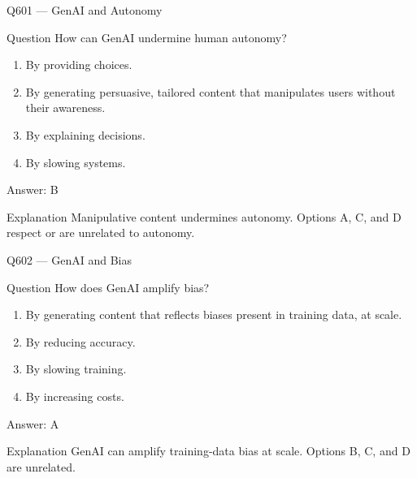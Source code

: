 \documentclass[aspectratio=169,8pt]{beamer}
\begin{document}
	\begin{frame}{Q601 --- GenAI and Autonomy}
		\begin{block}{Question}
			How can GenAI undermine human autonomy?
			\begin{enumerate}
				\item By providing choices.
				\item By generating persuasive, tailored content that manipulates users without their awareness.
				\item By explaining decisions.
				\item By slowing systems.
			\end{enumerate}
		\end{block}
		\begin{exampleblock}{Answer: B}\end{exampleblock}
		\begin{block}{Explanation}
			Manipulative content undermines autonomy. Options A, C, and D respect or are unrelated to autonomy.
		\end{block}
	\end{frame}
	
	\begin{frame}{Q602 --- GenAI and Bias}
		\begin{block}{Question}
			How does GenAI amplify bias?
			\begin{enumerate}
				\item By generating content that reflects biases present in training data, at scale.
				\item By reducing accuracy.
				\item By slowing training.
				\item By increasing costs.
			\end{enumerate}
		\end{block}
		\begin{exampleblock}{Answer: A}\end{exampleblock}
		\begin{block}{Explanation}
			GenAI can amplify training-data bias at scale. Options B, C, and D are unrelated.
		\end{block}
	\end{frame}
	
\end{document}
